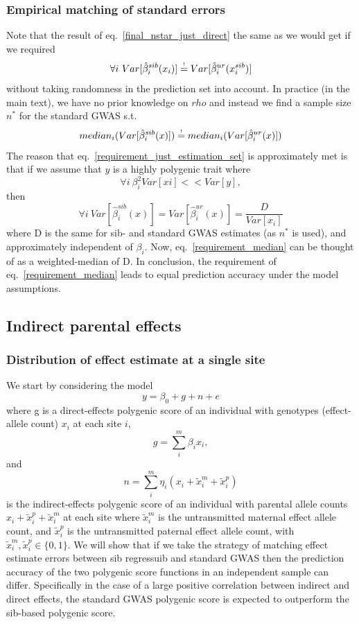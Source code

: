 \documentclass[hidelinks, 12pt]{article}
\begin{document}
\subsubsection{Empirical matching of standard errors}
\label{Empiricalmatchingofstandarderrors}
Note that the result of eq.~\ref{final_nstar_just_direct} the same as we would get if we required 
\begin{equation}
\label{requirement_just_estimation_set}
\forall i~Var[\hat{\beta}_i^{sib}(x_i)] \reqeq Var[\hat{\beta}_i^{ur}(x_i^{sib})]
\end{equation}
without taking randomness in the prediction set into account.  In practice (in the main text), we have no prior knowledge on $rho$ and instead we find a sample size $n^*$ for the standard GWAS s.t. 
\begin{equation}
\label{requirement_median}
median_i(Var[\hat{\beta}_i^{sib}(x)]) \reqeq median_i(Var[\hat{\beta}_i^{ur}(x)])
\end{equation}
The reason that eq.~\ref{requirement_just_estimation_set} is approximately met is that if we assume that $y$ is a highly polygenic trait where
$$ \forall i~\beta_i^2Var[xi] << Var[y],$$
then 
$$\forall i~Var[\hat{\beta}_i^{sib}(x)]=Var[\hat{\beta}_i^{ur}(x)]=\frac{D}{Var[x_i]}$$
where D is the same for sib- and standard GWAS estimates (as $n^*$ is used), and approximately independent of $\beta_i$.  Now, eq.~\ref{requirement_median} can be thought of as a weighted-median of D. In conclusion, the requirement of eq.~\ref{requirement_median} leads to equal prediction accuracy under the model assumptions.

\pagebreak

\subsection{Indirect parental effects}
\subsubsection{Distribution of effect estimate at a single site}
We start by considering the model
$$y=\beta_0+g+n+e$$
where g is a direct-effects polygenic score of an individual with genotypes (effect-allele count) $x_i$ at each site $i$,
$$g=\sum_i^m\beta_ix_i,$$ 
and 
$$n=\sum_i^m\eta_i(x_i+\tilde{x}_i^m+\tilde{x}_i^p)$$ 
is the indirect-effects polygenic score of an individual with parental allele counts $x_i+\tilde{x}_i^p+\tilde{x}_i^m$ at each site where $\tilde{x}_i^m$ is the untransmitted maternal effect allele count, and $\tilde{x}_i^p$ is the untransmitted paternal effect allele count, with $\tilde{x}_i^m,\tilde{x}_i^p \in \{0,1\}$.  We will show that if we take the strategy of matching effect estimate errors between sib regressuib and standard GWAS then the prediction accuracy of the two polygenic score functions in an independent sample can differ. Specifically in the case of a large positive correlation between indirect and direct effects, the standard GWAS polygenic score is expected to outperform the sib-based polygenic score.
\end{document}
